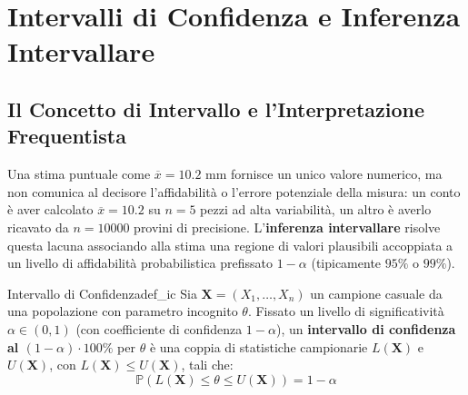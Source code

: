 \chapter{Intervalli di Confidenza e Inferenza Intervallare}
\label{cap:intervalli_di_confidenza}

\begin{abstract}
Il presente capitolo sviluppa la teoria della stima intervallare, lo strumento d'elezione per quantificare esplicitamente il grado di incertezza campionaria associato a una misura statistica. Si chiarisce l'autentico significato epistemologico frequentista del livello di confidenza $1-\alpha$, demistificando i comuni errori interpretativi. Viene formalizzato il metodo universale della quantità pivotale in 4 fasi e presentata la tassonomia esaustiva degli intervalli di confidenza: per la media di popolazioni gaussiane (con varianza nota e incognita), per proporzioni campionarie bernoulliane (con dimensionamento conservativo del campione), per il confronto tra due medie indipendenti (modelli a varianze note, omoschedastiche con pooled variance e modello di Welch) e per la varianza mediante pivot Chi-quadro.
\end{abstract}

\section{Il Concetto di Intervallo e l'Interpretazione Frequentista}
\label{sec:concetto_ic_frequentista}

Una stima puntuale come $\overline{x} = 10.2\text{ mm}$ fornisce un unico valore numerico, ma non comunica al decisore l'affidabilità o l'errore potenziale della misura: un conto è aver calcolato $\overline{x} = 10.2$ su $n=5$ pezzi ad alta variabilità, un altro è averlo ricavato da $n=10000$ provini di precisione. L'\textbf{inferenza intervallare} risolve questa lacuna associando alla stima una regione di valori plausibili accoppiata a un livello di affidabilità probabilistica prefissato $1-\alpha$ (tipicamente $95\%$ o $99\%$).

\begin{definizione}{Intervallo di Confidenza}{def_ic}
Sia $\mathbf{X} = (X_1, \dots, X_n)$ un campione casuale da una popolazione con parametro incognito $\theta$. Fissato un livello di significatività $\alpha \in (0, 1)$ (con coefficiente di confidenza $1-\alpha$), un \textbf{intervallo di confidenza al $(1-\alpha) \cdot 100\%$} per $\theta$ è una coppia di statistiche campionarie $L(\mathbf{X})$ e $U(\mathbf{X})$, con $L(\mathbf{X}) \le U(\mathbf{X})$, tali che:
\begin{equation}
    \mathbb{P}\left(L(\mathbf{X}) \le \theta \le U(\mathbf{X})\right) = 1 - \alpha
\end{equation}
\end{definizione}


